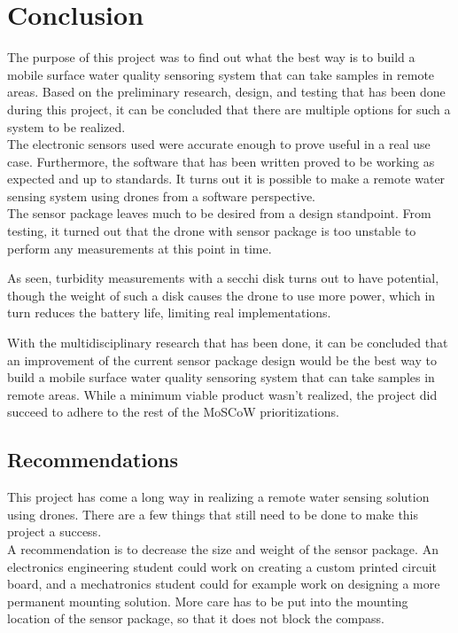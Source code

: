 \newpage
\section{Conclusion}
The purpose of this project was to find out what the best way is to build a mobile surface water quality sensoring system that can take samples in remote areas. Based on the preliminary research, design, and testing that has been done during this project, it can be concluded that there are multiple options for such a system to be realized. \\

The electronic sensors used were accurate enough to prove useful in a real use case. Furthermore, the software that has been written proved to be working as expected and up to standards. It turns out it is possible to make a remote water sensing system using drones from a software perspective.\\

The sensor package leaves much to be desired from a design standpoint. From testing, it turned out that the drone with sensor package is too unstable to perform any measurements at this point in time. 

As seen, turbidity measurements with a secchi disk turns out to have potential, though the weight of such a disk causes the drone to use more power, which in turn reduces the battery life, limiting real implementations.

With the multidisciplinary research that has been done, it can be concluded that an improvement of the current sensor package design would be the best way to build a mobile surface water quality sensoring system that can take samples in remote areas. While a minimum viable product wasn't realized, the project did succeed to adhere to the rest of the MoSCoW prioritizations.

\subsection{Recommendations}
This project has come a long way in realizing a remote water sensing solution using drones. There are a few things that still need to be done to make this project a success.\\

A recommendation is to decrease the size and weight of the sensor package. An electronics engineering student could work on creating a custom printed circuit board, and a mechatronics student could for example work on designing a more permanent mounting solution. More care has to be put into the mounting location of the sensor package, so that it does not block the compass.\\

